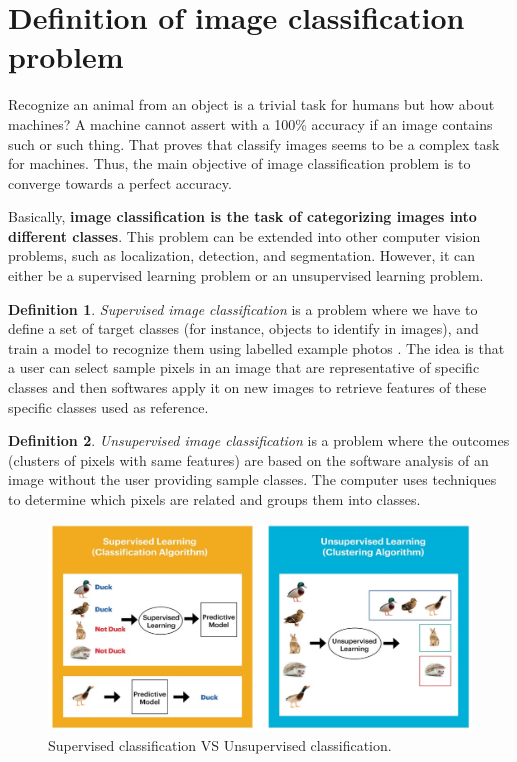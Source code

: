 \documentclass[11pt, openany]{report}
\theoremstyle{plain}
\theoremstyle{definition}
\newtheorem{defn}{Definition}[section]
\theoremstyle{remark}
\begin{document}
\section{Definition of image classification problem}
Recognize an animal from an object is a trivial task for humans but how about machines? A machine cannot assert with a 100\% accuracy if an image contains such or such thing. That proves that classify images seems to be a complex task for machines. Thus, the main objective of image classification problem is to converge towards a perfect accuracy. 

Basically, \textbf{image classification is the task of categorizing images into different classes}. This problem can be extended into other computer vision problems, such as localization, detection, and segmentation. However, it can either be a supervised learning problem or an unsupervised learning problem. 

\begin{defn}
\textit{Supervised image classification} is a problem where we have to define a set of target classes (for instance, objects to identify in images), and train a model to recognize them using labelled example photos \cite{Google-2}. The idea is that a user can select sample pixels in an image that are representative of specific classes and then softwares apply it on new images to retrieve features of these specific classes used as reference. 
\end{defn}

\begin{defn}
\textit{Unsupervised image classification} is a problem where the outcomes (clusters of pixels with same features) are based on the software analysis of an image without the user providing sample classes. The computer uses techniques to determine which pixels are related and groups them into classes. 
\end{defn}

\begin{figure}[h]
  \centering
  \includegraphics[scale=0.5]{figures/supervised-unsupervised-2.png}
  \caption{Supervised classification VS Unsupervised classification. \cite{supervisedVSunsupervised-2}}
  \label{fig:supervised-unsupervised-2}
\end{figure}
\end{document}

